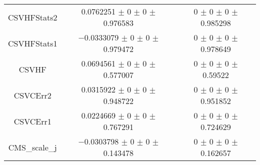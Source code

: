 \begin{table}
\begin{tabular}{ccc}
CSVHFStats2 	& \num{0.0762251} $\pm$ \num{0} $\pm$ \num{0} $\pm$ \num{0.976583} 	& \num{0} $\pm$ \num{0} $\pm$ \num{0} $\pm$ \num{0.985298}\\
CSVHFStats1 	& \num{-0.0333079} $\pm$ \num{0} $\pm$ \num{0} $\pm$ \num{0.979472} 	& \num{0} $\pm$ \num{0} $\pm$ \num{0} $\pm$ \num{0.978649}\\
CSVHF 	& \num{0.0694561} $\pm$ \num{0} $\pm$ \num{0} $\pm$ \num{0.577007} 	& \num{0} $\pm$ \num{0} $\pm$ \num{0} $\pm$ \num{0.59522}\\
CSVCErr2 	& \num{0.0315922} $\pm$ \num{0} $\pm$ \num{0} $\pm$ \num{0.948722} 	& \num{0} $\pm$ \num{0} $\pm$ \num{0} $\pm$ \num{0.951852}\\
CSVCErr1 	& \num{0.0224669} $\pm$ \num{0} $\pm$ \num{0} $\pm$ \num{0.767291} 	& \num{0} $\pm$ \num{0} $\pm$ \num{0} $\pm$ \num{0.724629}\\
CMS\_scale\_j 	& \num{-0.0303798} $\pm$ \num{0} $\pm$ \num{0} $\pm$ \num{0.143478} 	& \num{0} $\pm$ \num{0} $\pm$ \num{0} $\pm$ \num{0.162657}\\
\bottomrule
\end{tabular}
\end{table}